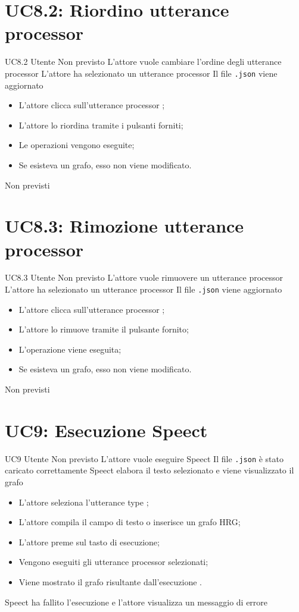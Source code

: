 \documentclass[../AnalisideiRequisiti.tex]{subfiles}
\begin{document}
\section{UC8.2: Riordino utterance processor}
\UserCase
{UC8.2}
{Utente}
{Non previsto}
{L'attore vuole cambiare l'ordine degli utterance processor}
{L'attore ha selezionato un utterance processor }
{Il file \verb|.json| viene aggiornato}
{
	\begin{itemize}
		\item{} L'attore clicca sull'utterance processor ;
		\item{} L'attore lo riordina tramite i pulsanti forniti;
		\item{} Le operazioni vengono eseguite;
		\item{} Se esisteva un grafo, esso non viene modificato.
		
	\end{itemize}
}
{Non previsti}

\section{UC8.3: Rimozione utterance processor}
\UserCase
{UC8.3}
{Utente}
{Non previsto}
{L'attore vuole rimuovere un utterance processor}
{L'attore ha selezionato un utterance processor }
{Il file \verb|.json| viene aggiornato}
{
	\begin{itemize}
		\item{} L'attore clicca sull'utterance processor ;
		\item{} L'attore lo rimuove tramite il pulsante fornito;
		\item{} L'operazione viene eseguita;
		\item{} Se esisteva un grafo, esso non viene modificato.
		
	\end{itemize}
}
{Non previsti}

\section{UC9: Esecuzione Speect}
\UserCase
{UC9}
{Utente}
{Non previsto}
{L'attore vuole eseguire Speect}
{Il file \verb|.json| è stato caricato correttamente }
{Speect elabora il testo selezionato e viene visualizzato il grafo}
{\begin{itemize}
		\item{} L'attore seleziona l'utterance type ;
		\item{} L'attore compila il campo di testo o inserisce un grafo HRG;
		\item{} L'attore preme sul tasto di esecuzione;
		\item{} Vengono eseguiti gli utterance processor selezionati;
		\item{} Viene mostrato il grafo risultante dall'esecuzione .
	\end{itemize}
}
{Speect ha fallito l'esecuzione e l'attore visualizza un messaggio di errore }
\end{document}
